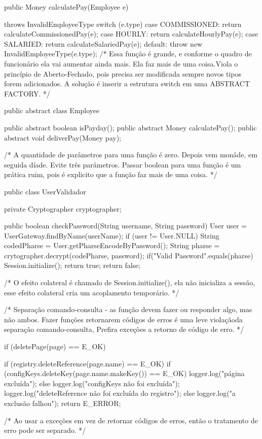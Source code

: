 public Money calculatePay(Employee e){
	throws InvalidEmployeeType{
		switch (e.type){
			case COMMISSIONED:
				return calculateCommissionedPay(e);
			case HOURLY:
				return calculateHourlyPay(e);
			case SALARIED:
				return calculateSalariedPay(e);
			default:
			throw new InvalidEmployeeType(e.type);
		}
	}/* Essa função é grande, e conforme o quadro de funcionário ela vai aumentar ainda mais.
		Ela faz mais de uma coisa.Viola o princípio de Aberto-Fechado, 
		pois precisa ser modificada sempre novos tipos forem adicionados.
		A solução é inserir a estrutura switch em uma ABSTRACT FACTORY.
	*/
	
public abstract class Employee{
	
	public abstract boolean isPayday();
	public abstract Money calculatePay();
	public abstract void deliverPay(Money pay);
}
/*
A quantidade de parâmetros para uma função é zero. Depois vem monâde, em seguida díade.
Evite três parâmetros. Passar boolean para uma função é um prática ruim, 
pois é explicito que a função faz mais de uma coisa.
*/

public class UserValidador{
	
	private Cryptographer cryptographer;
	
	public boolean checkPassword(String username, String password){
		User user = UserGateway.findByName(userName);
		if (user != User.NULL) {
			String codedPharse = User.getPharseEncodeByPassword();
			String pharse = crytographer.decrypt(codePharse, password);
			if("Valid Password".equals(pharse){
				Session.initialize();
				return true;
			}
		}
		return false;
	}

/*
O efeito colateral é chamado de Session.initialize(), ela não inicializa a sessão, 
esse efeito colateral cria um acoplamento temporário.
*/

/*
Separação comando-consulta - as função devem fazer ou responder algo, mas não ambos.
Fazer funções retornarem códigos de erros é uma leve violaçãoda separação comando-consulta,
Prefira exceções a retorno de código de erro.
*/

if (deletePage(page) == E_OK) {
	if (registry.deleteReference(page.name) == E_OK){
		if (configKeys.deleteKey(page.name.makeKey()) == E_OK){
			logger.log("página excluída");
		}else { 
			logger.log("configKeys não foi excluída");
		}
		logger.log("deleteReference não foi excluída do registro");
	}else{
		logger.log("a exclusão falhou");
		return E_ERROR;
	}

/* 
Ao usar a exceções em vez de retornar códigos de erros, 
então o tratamento de erro pode ser separado.
*/

}}}
